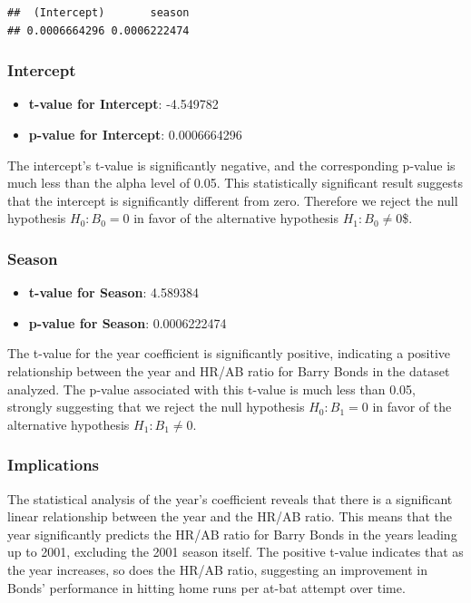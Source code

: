 \documentclass[
]{article}
\providecommand{\tightlist}{%
  \setlength{\itemsep}{0pt}\setlength{\parskip}{0pt}}
\begin{document}
\begin{verbatim}
##  (Intercept)       season 
## 0.0006664296 0.0006222474
\end{verbatim}

\subsubsection{Intercept}\label{intercept}

\begin{itemize}
\tightlist
\item
  \textbf{t-value for Intercept}: -4.549782
\item
  \textbf{p-value for Intercept}: 0.0006664296
\end{itemize}

The intercept's t-value is significantly negative, and the corresponding
p-value is much less than the alpha level of 0.05. This statistically
significant result suggests that the intercept is significantly
different from zero. Therefore we reject the null hypothesis
\(H_0: B_{0} = 0\) in favor of the alternative hypothesis
\(H_1: B_{0} \neq 0\)\$.

\subsubsection{Season}\label{season}

\begin{itemize}
\tightlist
\item
  \textbf{t-value for Season}: 4.589384
\item
  \textbf{p-value for Season}: 0.0006222474
\end{itemize}

The t-value for the year coefficient is significantly positive,
indicating a positive relationship between the year and HR/AB ratio for
Barry Bonds in the dataset analyzed. The p-value associated with this
t-value is much less than 0.05, strongly suggesting that we reject the
null hypothesis \(H_0: B_{1} = 0\) in favor of the alternative
hypothesis \(H_1: B_{1} \neq 0\).

\subsubsection{Implications}\label{implications}

The statistical analysis of the year's coefficient reveals that there is
a significant linear relationship between the year and the HR/AB ratio.
This means that the year significantly predicts the HR/AB ratio for
Barry Bonds in the years leading up to 2001, excluding the 2001 season
itself. The positive t-value indicates that as the year increases, so
does the HR/AB ratio, suggesting an improvement in Bonds' performance in
hitting home runs per at-bat attempt over time.
\end{document}

